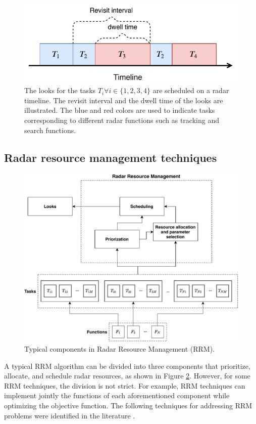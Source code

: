 \documentclass[english, 12pt, a4paper, elec, utf8, a-1b, online]{aaltothesis}
\numberwithin{equation}{section}
\begin{document}
\begin{figure}[h]
    \centering
    \includegraphics{figures/timeline.pdf}
    \caption{
        The looks for the tasks $T_i \forall i\in\{1,2,3,4\}$ are scheduled on a radar timeline. 
        The revisit interval and the dwell time of the looks are illustrated.
        The blue and red colors are used to indicate tasks corresponding to different radar functions such as tracking and search functions.
    }
    \label{fig:timeline}
\end{figure}

\subsection{Radar resource management techniques} \label{sec:RRM_tech}

\begin{figure}[tb]
    \centering
    \includegraphics[width=.9\linewidth]{figures/RRM_diagram.pdf}
    \caption{Typical components in Radar Resource Management (RRM).}
    \label{fig:RRM_diagram}
\end{figure}

A typical RRM algorithm can be divided into three components that prioritize, allocate, and schedule radar resources, as shown in Figure \ref{fig:RRM_diagram}.
However, for some RRM techniques, the division is not strict.
For example, RRM techniques can implement jointly the functions of each aforementioned component while optimizing the objective function.
The following techniques for addressing RRM problems were identified in the literature \cite{Moo2016, Koch1999, Krishnamurthy2001, Wintenby2006, LaScala2006, Rajkumar1997, Rajkumar1998, Kastella1997, Kreucher2004, Kreucher2005, Xu2010}.
\end{document}
